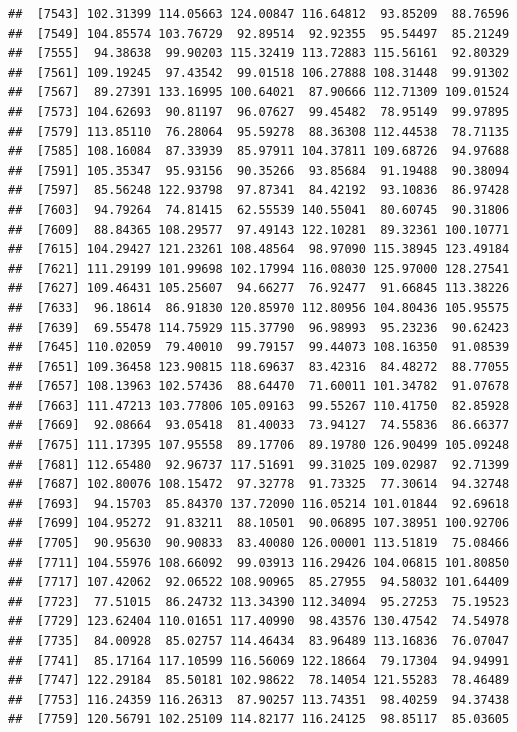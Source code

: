 \documentclass[
]{article}
\begin{document}
\begin{verbatim}
##  [7543] 102.31399 114.05663 124.00847 116.64812  93.85209  88.76596
##  [7549] 104.85574 103.76729  92.89514  92.92355  95.54497  85.21249
##  [7555]  94.38638  99.90203 115.32419 113.72883 115.56161  92.80329
##  [7561] 109.19245  97.43542  99.01518 106.27888 108.31448  99.91302
##  [7567]  89.27391 133.16995 100.64021  87.90666 112.71309 109.01524
##  [7573] 104.62693  90.81197  96.07627  99.45482  78.95149  99.97895
##  [7579] 113.85110  76.28064  95.59278  88.36308 112.44538  78.71135
##  [7585] 108.16084  87.33939  85.97911 104.37811 109.68726  94.97688
##  [7591] 105.35347  95.93156  90.35266  93.85684  91.19488  90.38094
##  [7597]  85.56248 122.93798  97.87341  84.42192  93.10836  86.97428
##  [7603]  94.79264  74.81415  62.55539 140.55041  80.60745  90.31806
##  [7609]  88.84365 108.29577  97.49143 122.10281  89.32361 100.10771
##  [7615] 104.29427 121.23261 108.48564  98.97090 115.38945 123.49184
##  [7621] 111.29199 101.99698 102.17994 116.08030 125.97000 128.27541
##  [7627] 109.46431 105.25607  94.66277  76.92477  91.66845 113.38226
##  [7633]  96.18614  86.91830 120.85970 112.80956 104.80436 105.95575
##  [7639]  69.55478 114.75929 115.37790  96.98993  95.23236  90.62423
##  [7645] 110.02059  79.40010  99.79157  99.44073 108.16350  91.08539
##  [7651] 109.36458 123.90815 118.69637  83.42316  84.48272  88.77055
##  [7657] 108.13963 102.57436  88.64470  71.60011 101.34782  91.07678
##  [7663] 111.47213 103.77806 105.09163  99.55267 110.41750  82.85928
##  [7669]  92.08664  93.05418  81.40033  73.94127  74.55836  86.66377
##  [7675] 111.17395 107.95558  89.17706  89.19780 126.90499 105.09248
##  [7681] 112.65480  92.96737 117.51691  99.31025 109.02987  92.71399
##  [7687] 102.80076 108.15472  97.32778  91.73325  77.30614  94.32748
##  [7693]  94.15703  85.84370 137.72090 116.05214 101.01844  92.69618
##  [7699] 104.95272  91.83211  88.10501  90.06895 107.38951 100.92706
##  [7705]  90.95630  90.90833  83.40080 126.00001 113.51819  75.08466
##  [7711] 104.55976 108.66092  99.03913 116.29426 104.06815 101.80850
##  [7717] 107.42062  92.06522 108.90965  85.27955  94.58032 101.64409
##  [7723]  77.51015  86.24732 113.34390 112.34094  95.27253  75.19523
##  [7729] 123.62404 110.01651 117.40990  98.43576 130.47542  74.54978
##  [7735]  84.00928  85.02757 114.46434  83.96489 113.16836  76.07047
##  [7741]  85.17164 117.10599 116.56069 122.18664  79.17304  94.94991
##  [7747] 122.29184  85.50181 102.98622  78.14054 121.55283  78.46489
##  [7753] 116.24359 116.26313  87.90257 113.74351  98.40259  94.37438
##  [7759] 120.56791 102.25109 114.82177 116.24125  98.85117  85.03605

\end{verbatim}
\end{document}
